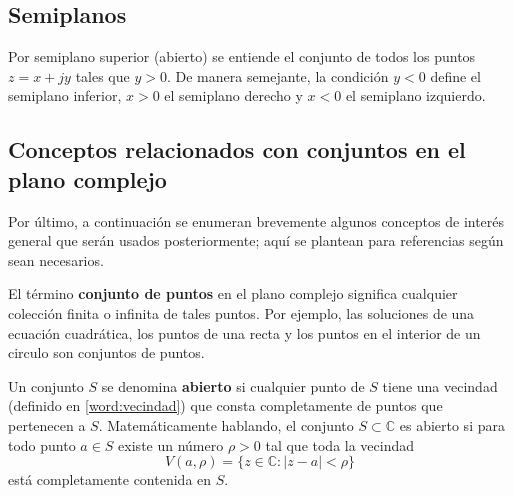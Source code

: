 \subsection{Semiplanos}

Por semiplano superior (abierto) se entiende el conjunto de todos los puntos $z=x+jy$ tales que $y>0$. De manera semejante, la condición $y<0$ define el semiplano inferior, $x>0$ el semiplano derecho y $x<0$ el semiplano izquierdo.

\subsection{Conceptos relacionados con conjuntos en el plano complejo}

Por último, a continuación se enumeran brevemente algunos conceptos de interés general que serán usados posteriormente; aquí se plantean para referencias según sean necesarios.

El término \textbf{conjunto de puntos} en el plano complejo significa cualquier colección finita o infinita de tales puntos. Por ejemplo, las soluciones de una ecuación cuadrática, los puntos de una recta y los puntos en el interior de un circulo son conjuntos de puntos.

Un conjunto $S$ se denomina \textbf{abierto} si cualquier punto de $S$ tiene una vecindad (definido en \ref{word:vecindad}) que consta completamente de puntos que pertenecen a $S$. Matemáticamente hablando, el conjunto $S \subset \mathbb{C}$ es abierto si para todo punto $a \in S$ existe un número $\rho > 0$ tal que toda la vecindad
\[
V(a,\rho) = \{z \in \mathbb{C} : |z - a| < \rho\}
\]
está completamente contenida en \( S \).

